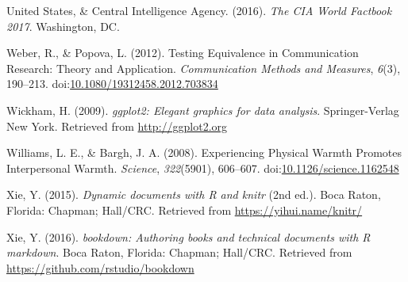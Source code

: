 \documentclass[english,floatsintext,man]{apa6}
\theoremstyle{definition}
\theoremstyle{definition}
\theoremstyle{definition}
\theoremstyle{remark}
\begin{document}
\hypertarget{ref-UnitedStates2016}{}
United States, \& Central Intelligence Agency. (2016). \emph{The CIA
World Factbook 2017}. Washington, DC.

\hypertarget{ref-Weber2012}{}
Weber, R., \& Popova, L. (2012). Testing Equivalence in Communication
Research: Theory and Application. \emph{Communication Methods and
Measures}, \emph{6}(3), 190--213.
doi:\href{https://doi.org/10.1080/19312458.2012.703834}{10.1080/19312458.2012.703834}

\hypertarget{ref-R-ggplot2}{}
Wickham, H. (2009). \emph{ggplot2: Elegant graphics for data analysis}.
Springer-Verlag New York. Retrieved from \url{http://ggplot2.org}

\hypertarget{ref-Williams2008}{}
Williams, L. E., \& Bargh, J. A. (2008). Experiencing Physical Warmth
Promotes Interpersonal Warmth. \emph{Science}, \emph{322}(5901),
606--607.
doi:\href{https://doi.org/10.1126/science.1162548}{10.1126/science.1162548}

\hypertarget{ref-R-knitr}{}
Xie, Y. (2015). \emph{Dynamic documents with R and knitr} (2nd ed.).
Boca Raton, Florida: Chapman; Hall/CRC. Retrieved from
\url{https://yihui.name/knitr/}

\hypertarget{ref-R-bookdown}{}
Xie, Y. (2016). \emph{bookdown: Authoring books and technical documents
with R markdown}. Boca Raton, Florida: Chapman; Hall/CRC. Retrieved from
\url{https://github.com/rstudio/bookdown}
\end{document}
